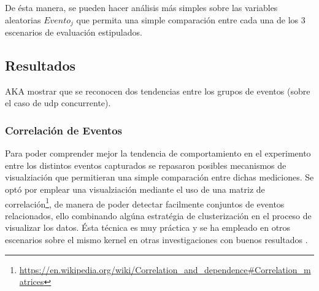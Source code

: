 De ésta manera, se pueden hacer análisis más simples sobre las variables aleatorias $Evento_j$ que permita una simple comparación entre cada una de los 3 escenarios de evaluación estipulados.

\subsection{Resultados}
AKA mostrar que se reconocen dos tendencias entre los grupos de eventos (sobre el caso de udp concurrente).


\subsubsection{Correlación de Eventos}
Para poder comprender mejor la tendencia de comportamiento en el experimento entre los distintos eventos capturados se repasaron posibles mecanismos de visualziación que permitieran una simple comparación entre dichas mediciones. Se optó por emplear una visualziación mediante el uso de una matriz de correlación\footnote{\url{https://en.wikipedia.org/wiki/Correlation_and_dependence#Correlation_matrices}}, de manera de poder detectar facilmente conjuntos de eventos relacionados, ello combinando algúna estratégia de clusterización en el proceso de visualizar los datos. Ésta técnica es muy práctica y se ha empleado en otros escenarios sobre el mismo kernel en otras investigaciones con buenos resultados \cite{paper:clusteringKernel}.

